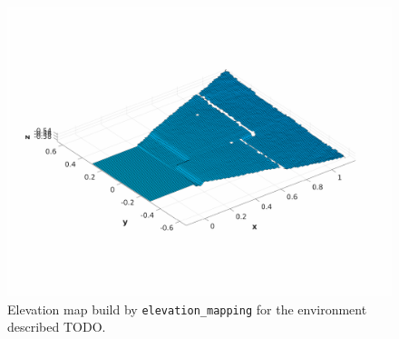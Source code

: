 \begin{figure}
  \centering
  \includegraphics[width=\textwidth]{figures/onlymap-xtion-20cm.pdf}
  \caption{Elevation map build by \texttt{elevation\_mapping} for the 
      environment described TODO.}
  \label{fig:onlymap-xtion-20cm}
\end{figure}

